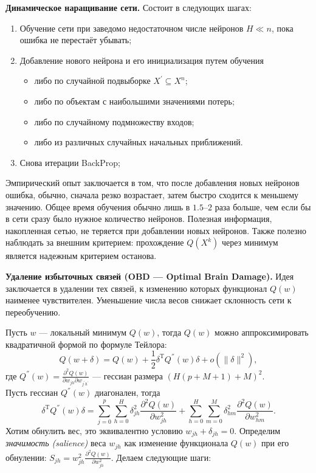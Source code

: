\documentclass{article}
\begin{document}
	\textbf{Динамическое наращивание сети.} 
	Состоит в следующих шагах:
	\begin{enumerate}
		\item Обучение сети при заведомо недостаточном числе нейронов $H \ll n$, пока ошибка не перестаёт убывать;
		\item Добавление нового нейрона и его инициализация путем обучения 
		\begin{itemize}
			\item либо по случайной подвыборке $X^{'} \subseteq X^n$;
			\item либо по объектам с наибольшими значениями потерь;
			\item либо по случайному подмножеству входов;
			\item либо из различных случайных начальных приближений.
		\end{itemize}
		\item Снова итерации BackProp;
	\end{enumerate}
	
	Эмпирический опыт заключается в том, что после добавления новых нейронов ошибка, обычно, сначала резко возрастает, затем быстро сходится к меньшему значению. Общее время обучения обычно лишь в $1.5$--$2$ раза больше, чем если бы в сети сразу было нужное количество нейронов. Полезная информация, накопленная сетью, не теряется при добавлении новых нейронов. Также полезно наблюдать за внешним критерием: прохождение $Q(X^k)$ через минимум является надежным критерием останова.
	
	\textbf{Удаление избыточных связей (OBD --- Optimal Brain Damage).} Идея заключается в удалении тех связей, к изменению которых функционал $Q(w)$ наименее чувствителен. Уменьшение числа весов снижает склонность сети к переобучению.
	
	Пусть $w$ --- локальный минимум $Q(w)$, тогда $Q(w)$ можно аппроксимировать квадратичной формой по формуле Тейлора:
	\begin{equation*}
		Q(w + \delta) = Q(w) + \frac{1}{2} \delta^{\mathrm{T}} Q^{''}(w) \delta + o(\| \delta\|^2),
	\end{equation*}
	где $Q^{''}(w) =  \frac{\partial^2 Q(w) }{\partial w_{jh} \partial w_{j^{'}h^{'}}}$ --- гессиан размера $(H(p+M+1) + M)^2$.\\
	
	Пусть гессиан $Q^{''}(w)$ диагонален, тогда
	\begin{equation*}
		\delta^{\mathrm{T}} Q^{''}(w) \delta = \sum_{j=0}^{p}\sum_{h=0}^{H} \delta^2_{jh}   \frac{\partial^2 Q(w) }{\partial w_{jh}^2 }  +  \sum_{h=0}^{H}\sum_{m=0}^{M} \delta^2_{hm}   \frac{\partial^2 Q(w) }{\partial w_{hm}^2 }.
	\end{equation*}
	Хотим обнулить вес, это эквивалентно условию $w_{jh} + \delta_{jh}=0$. Определим \textit{значимость (salience)} веса $w_{jh}$ как изменение функционала $Q(w)$ при его обнулении: $S_{jh} = w^2_{jh}  \frac{\partial^2 Q(w) }{\partial w_{jh}^2 } $. Делаем следующие шаги:
	
\end{document}
